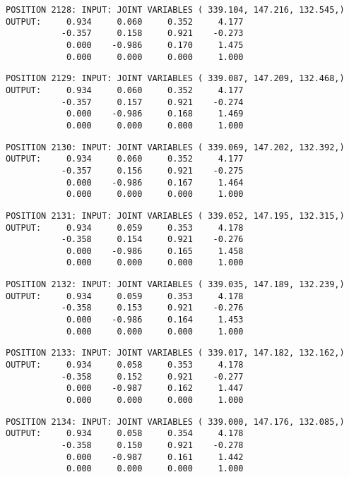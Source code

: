 \begin{verbatim}
POSITION 2128: INPUT: JOINT VARIABLES ( 339.104, 147.216, 132.545,)
OUTPUT:     0.934     0.060     0.352     4.177
           -0.357     0.158     0.921    -0.273
            0.000    -0.986     0.170     1.475
            0.000     0.000     0.000     1.000
\end{verbatim} \pagebreak[1]\begin{verbatim}
POSITION 2129: INPUT: JOINT VARIABLES ( 339.087, 147.209, 132.468,)
OUTPUT:     0.934     0.060     0.352     4.177
           -0.357     0.157     0.921    -0.274
            0.000    -0.986     0.168     1.469
            0.000     0.000     0.000     1.000
\end{verbatim} \pagebreak[1]\begin{verbatim}
POSITION 2130: INPUT: JOINT VARIABLES ( 339.069, 147.202, 132.392,)
OUTPUT:     0.934     0.060     0.352     4.177
           -0.357     0.156     0.921    -0.275
            0.000    -0.986     0.167     1.464
            0.000     0.000     0.000     1.000
\end{verbatim} \pagebreak[1]\begin{verbatim}
POSITION 2131: INPUT: JOINT VARIABLES ( 339.052, 147.195, 132.315,)
OUTPUT:     0.934     0.059     0.353     4.178
           -0.358     0.154     0.921    -0.276
            0.000    -0.986     0.165     1.458
            0.000     0.000     0.000     1.000
\end{verbatim} \pagebreak[1]\begin{verbatim}
POSITION 2132: INPUT: JOINT VARIABLES ( 339.035, 147.189, 132.239,)
OUTPUT:     0.934     0.059     0.353     4.178
           -0.358     0.153     0.921    -0.276
            0.000    -0.986     0.164     1.453
            0.000     0.000     0.000     1.000
\end{verbatim} \pagebreak[1]\begin{verbatim}
POSITION 2133: INPUT: JOINT VARIABLES ( 339.017, 147.182, 132.162,)
OUTPUT:     0.934     0.058     0.353     4.178
           -0.358     0.152     0.921    -0.277
            0.000    -0.987     0.162     1.447
            0.000     0.000     0.000     1.000
\end{verbatim} \pagebreak[1]\begin{verbatim}
POSITION 2134: INPUT: JOINT VARIABLES ( 339.000, 147.176, 132.085,)
OUTPUT:     0.934     0.058     0.354     4.178
           -0.358     0.150     0.921    -0.278
            0.000    -0.987     0.161     1.442
            0.000     0.000     0.000     1.000
\end{verbatim} \pagebreak[1]\begin{verbatim}

\end{verbatim}
